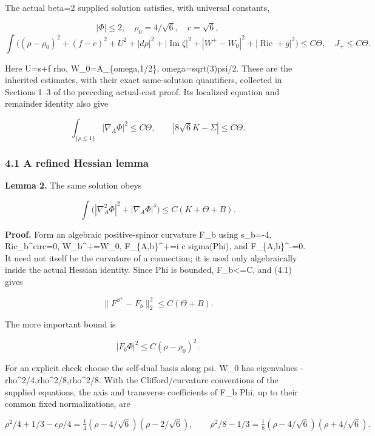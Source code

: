 \documentclass[
  10pt,
]{article}
\begin{document}
The actual beta=2 supplied solution satisfies, with universal constants,

\[
 |\Phi|\le2,\quad \rho_0=4/\sqrt6,\quad c=\sqrt6,
\] \[
 \int\bigl((\rho-\rho_0)^2+(f-c)^2+U^2+|d\rho|^2
       +|\operatorname{Im}\zeta|^2+|W^+-W_0|^2
       +|\operatorname{Ric}+g|^2\bigr)\le C\Theta,
 \quad J_+\le C\Theta.                              \tag{4.1}
\]

Here U=s+f rho, W\_0=A\_\{omega,1/2\}, omega=sqrt(3)psi/2. These are the
inherited estimates, with their exact same-solution quantifiers,
collected in Sections 1--3 of the preceding actual-cost proof. Its
localized equation and remainder identity also give

\[
 \int_{\{\rho\le1\}}|\nabla_A\Phi|^2\le C\Theta,
 \qquad |8\sqrt6 K-\Sigma|\le C\Theta.               \tag{4.2}
\]

\hypertarget{a-refined-hessian-lemma}{%
\subsubsection{4.1 A refined Hessian
lemma}\label{a-refined-hessian-lemma}}

\textbf{Lemma 2.} The same solution obeys

\[
 \boxed{\int\bigl(|\nabla_A^2\Phi|^2+|\nabla_A\Phi|^4\bigr)
               \le C(K+\Theta+B).}                  \tag{4.3}
\]

\textbf{Proof.} Form an algebraic positive-spinor curvature F\_b using
s\_b=-4, Ric\_b\^{}circ=0, W\_b\^{}+=W\_0, F\_\{A,b\}\^{}+=i c
sigma(Phi), and F\_\{A,b\}\^{}-=0. It need not itself be the curvature
of a connection; it is used only algebraically inside the actual Hessian
identity. Since Phi is bounded, \textbar F\_b\textbar\textless=C, and
(4.1) gives

\[
 \|F^{S^+}-F_b\|_2^2\le C(\Theta+B).                \tag{4.4}
\]

The more important bound is

\[
                  |F_b\Phi|^2\le C(\rho-\rho_0)^2.  \tag{4.5}
\]

For an explicit check choose the self-dual basis along psi. W\_0 has
eigenvalues -rho\^{}2/4,rho\^{}2/8,rho\^{}2/8. With the
Clifford/curvature conventions of the supplied equations, the axis and
transverse coefficients of F\_b Phi, up to their common fixed
normalizations, are

\[
 \rho^2/4+1/3-c\rho/4
     =\tfrac14(\rho-4/\sqrt6)(\rho-2/\sqrt6),
 \qquad
 \rho^2/8-1/3
     =\tfrac18(\rho-4/\sqrt6)(\rho+4/\sqrt6).
\]
\end{document}

